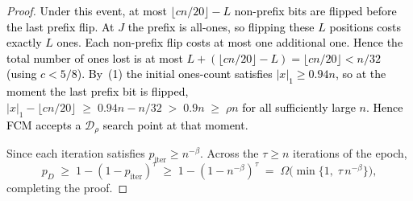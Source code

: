 \documentclass[lettersize,journal]{IEEEtran}
\newcommand{\rerev}[1]{\textcolor{black}{#1}}
\begin{document}
{\begin{proof}
\rerev{Under this event, at most $\lfloor cn/20\rfloor - L$ non-prefix
	bits are flipped before the last prefix flip.
	At $J$ the prefix is all-ones, so flipping these $L$ positions
	costs exactly $L$ ones.  Each non-prefix flip costs at most one
	additional one.  Hence the total number of ones lost is at most
	$L + (\lfloor cn/20\rfloor - L) = \lfloor cn/20\rfloor < n/32$
	(using $c<5/8$).
	By~(1) the initial ones-count satisfies $|x|_1\ge 0.94n$, so at
	the moment the last prefix bit is flipped,}
$|x|_1 - \lfloor cn/20\rfloor\;\ge\;0.94n - n/32
	\;>\; 0.9n
	\;\ge\;\rho n$
\rerev{for all sufficiently large $n$.
Hence FCM accepts a $\mathcal{D}_\rho$ search point at that moment.}
	
Since each iteration satisfies \(p_{\text{iter}}\ge n^{-\beta}\).
	Across the \(\tau\ge n\) iterations of the epoch,
	\[
	p_D
	\;\ge\;
	1-(1-p_{\text{iter}})^{\tau}
	\;\ge\;
1-(1-n^{-\beta})^\tau 
	\;=\;
	\Omega\!\bigl(\min\{1,\;\tau\,n^{-\beta}\}\bigr),
	\]
	completing the proof.
\end{proof}










% 
%
%
%

}
\end{document}

